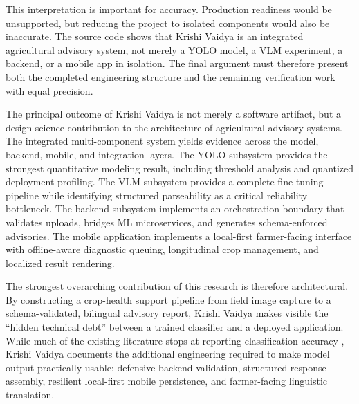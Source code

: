 This interpretation is important for accuracy. Production readiness would be unsupported, but
reducing the project to isolated components would also be inaccurate. The source code shows that
Krishi Vaidya is an integrated agricultural advisory system, not merely a YOLO model, a VLM
experiment, a backend, or a mobile app in isolation. The final argument must therefore present
both the completed engineering structure and the remaining verification work with equal precision.



The principal outcome of Krishi Vaidya is not merely a software artifact, but a design-science
contribution to the architecture of agricultural advisory systems. The integrated
multi-component system yields evidence across the model, backend, mobile, and integration
layers. The YOLO subsystem provides the strongest quantitative modeling result, including
threshold analysis and quantized deployment profiling. The VLM subsystem provides a complete
fine-tuning pipeline while identifying structured parseability as a critical reliability
bottleneck. The backend subsystem implements an orchestration boundary that validates uploads,
bridges ML microservices, and generates schema-enforced advisories. The mobile application
implements a local-first \parencite{kleppmannLocalFirst2019} farmer-facing interface with
offline-aware diagnostic queuing, longitudinal crop management, and localized result rendering.

The strongest overarching contribution of this research is therefore architectural. By
constructing a crop-health support pipeline from field image capture to a schema-validated,
bilingual advisory report, Krishi Vaidya makes visible the ``hidden technical debt''
\parencite{sculleyMLTechDebt2015} between a trained classifier and a deployed application. While
much of the existing literature stops at reporting classification accuracy
\parencite{liu2021plantDiseaseReview, wangAgriLLaVA2024}, Krishi Vaidya documents the additional
engineering required to make model output practically usable: defensive backend validation,
structured response assembly, resilient local-first mobile persistence, and farmer-facing
linguistic translation.

